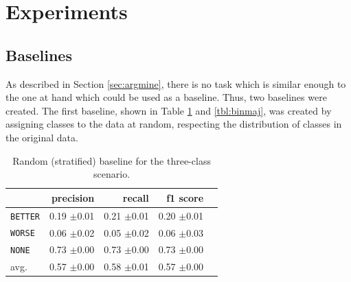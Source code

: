 \section{Experiments}
\subsection{Baselines}
\label{sec:3_baseline}
As described in Section \ref{sec:argmine}, there is no task which is similar enough to the one at hand which could be used as a baseline. Thus, two baselines were created. 
The first baseline, shown in Table \ref{tbl:3stratifiedbaseline} and \ref{tbl:binmaj}, was created by assigning classes to the data at random, respecting the distribution of classes in the original data.  
\begin{table}[!htb]
	\begin{minipage}{.5\linewidth}
		\caption{Random (stratified) baseline for the three-class scenario.}
		\label{tbl:3stratifiedbaseline}
		\centering
		      
		\begin{tabularx}{0.97\linewidth}{Xrrrr}
			\toprule
			                & precision                    & recall                       & f1 score                     \\ \midrule 
			\texttt{BETTER} & 0.19 \scriptsize{$\pm$0.01} & 0.21 \scriptsize{$\pm$0.01} & 0.20 \scriptsize{$\pm$0.01} \\ 
			\texttt{WORSE}  & 0.06 \scriptsize{$\pm$0.02} & 0.05 \scriptsize{$\pm$0.02} & 0.06 \scriptsize{$\pm$0.03} \\ 
			\texttt{NONE}   & 0.73 \scriptsize{$\pm$0.00}  & 0.73 \scriptsize{$\pm$0.00} & 0.73 \scriptsize{$\pm$0.00} \\ 
			avg.         & 0.57 \scriptsize{$\pm$0.00} & 0.58 \scriptsize{$\pm$0.01} & 0.57 \scriptsize{$\pm$0.00} \\ 
			\bottomrule
		\end{tabularx} 
		

\end{minipage}
\end{table}
